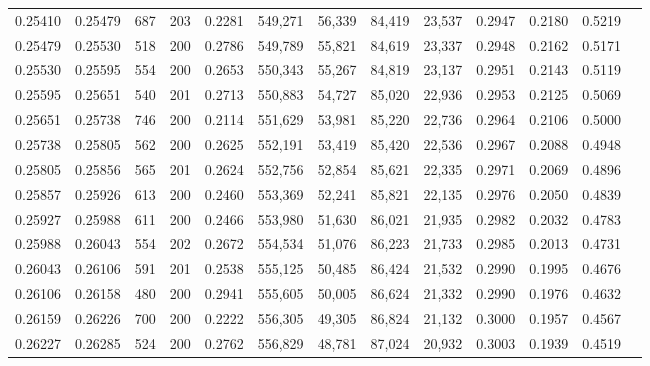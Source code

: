 \begin{tabular}{rrrrrrrrrrrrr}
0.25410 & 0.25479 &   687 & 203 &                                     0.2281 & 549,271 &  56,339 &  84,419 &  23,537 & 0.2947 & 0.2180 & 0.5219 \\
0.25479 & 0.25530 &   518 & 200 &                                     0.2786 & 549,789 &  55,821 &  84,619 &  23,337 & 0.2948 & 0.2162 & 0.5171 \\
0.25530 & 0.25595 &   554 & 200 &                                     0.2653 & 550,343 &  55,267 &  84,819 &  23,137 & 0.2951 & 0.2143 & 0.5119 \\
0.25595 & 0.25651 &   540 & 201 &                                     0.2713 & 550,883 &  54,727 &  85,020 &  22,936 & 0.2953 & 0.2125 & 0.5069 \\
0.25651 & 0.25738 &   746 & 200 &                                     0.2114 & 551,629 &  53,981 &  85,220 &  22,736 & 0.2964 & 0.2106 & 0.5000 \\
0.25738 & 0.25805 &   562 & 200 &                                     0.2625 & 552,191 &  53,419 &  85,420 &  22,536 & 0.2967 & 0.2088 & 0.4948 \\
0.25805 & 0.25856 &   565 & 201 &                                     0.2624 & 552,756 &  52,854 &  85,621 &  22,335 & 0.2971 & 0.2069 & 0.4896 \\
0.25857 & 0.25926 &   613 & 200 &                                     0.2460 & 553,369 &  52,241 &  85,821 &  22,135 & 0.2976 & 0.2050 & 0.4839 \\
0.25927 & 0.25988 &   611 & 200 &                                     0.2466 & 553,980 &  51,630 &  86,021 &  21,935 & 0.2982 & 0.2032 & 0.4783 \\
0.25988 & 0.26043 &   554 & 202 &                                     0.2672 & 554,534 &  51,076 &  86,223 &  21,733 & 0.2985 & 0.2013 & 0.4731 \\
0.26043 & 0.26106 &   591 & 201 &                                     0.2538 & 555,125 &  50,485 &  86,424 &  21,532 & 0.2990 & 0.1995 & 0.4676 \\
0.26106 & 0.26158 &   480 & 200 &                                     0.2941 & 555,605 &  50,005 &  86,624 &  21,332 & 0.2990 & 0.1976 & 0.4632 \\
0.26159 & 0.26226 &   700 & 200 &                                     0.2222 & 556,305 &  49,305 &  86,824 &  21,132 & 0.3000 & 0.1957 & 0.4567 \\
0.26227 & 0.26285 &   524 & 200 &                                     0.2762 & 556,829 &  48,781 &  87,024 &  20,932 & 0.3003 & 0.1939 & 0.4519 \\

\end{tabular}
